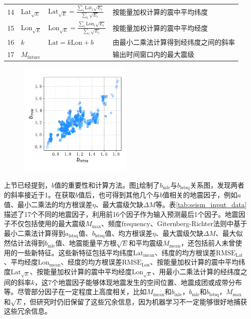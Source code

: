 \begin{table}
\begin{tabular}{llll}
    14 & $\text{Lat}_{\sqrt{E}}$ & $\displaystyle \text{Lat}_{\sqrt{E}}=\frac{\sum_i{\text{Lat}_i\sqrt{E_i}}}{\sum_i{\sqrt{E_i}}}$ & 按能量加权计算的震中平均纬度 \\ 
    15 & $\text{Lon}_{\sqrt{E}}$ & $\displaystyle \text{Lon}_{\sqrt{E}}=\frac{\sum_i{\text{Lon}_i\sqrt{E_i}}}{\sum_i{\sqrt{E_i}}}$ & 按能量加权计算的震中平均经度 \\ 
    16 & $k$ & $\text{Lat}=k\text{Lon}+b$ & 由最小二乘法计算得到经纬度之间的斜率 \\
    17 & $M_{\text{future}}$ & & 输出时间窗口内的最大震级 \\
    \bottomrule
  \end{tabular} 
\end{table}

\begin{figure}[!htbp]
  \centering
  \includegraphics[width=0.50\textwidth]{Img/chap5_seism/seism_b_lstsq_mle_1932_2021.pdf}
  \vspace{-0.5cm}
  \label{fig:seism_b_lstsq_mle_1932_2021}
\end{figure}

上节已经提到，$b$值的重要性和计算方法。图\ref{fig:seism_b_lstsq_mle_1932_2021}绘制了$b_\text{mle}$与$b_\text{lstsq}$关系图，发现两者的斜率接近于1。在获取$b$值后，也可得到其他几个与$b$值相关的地震因子，例如$a$值、最小二乘法的均方根误差$\eta$、最大震级欠缺$\Delta M$等。表\ref{tab:seism_input_data}描述了17个不同的地震因子，利用前16个因子作为输入预测最后1个因子。地震因子不仅包括\citet{Panakkat2007Neural}使用的最大震级$M_{\max}$、频度$\text{frequency}$、Giternberg-Richter法则中基于最小二乘法计算得到$a_{\text{lstsq}}$值、$b_{\text{lstsq}}$值、均方根误差$\eta$、最大震级欠缺$\Delta M$、最大似然估计法得到$b_{\text{mle}}$值、地震能量平方根$\sqrt{E}$和平均震级$M_{\text{mean}}$，还包括前人未曾使用的一些新特征。这些新特征包括平均纬度$\text{Lat}_{\text{mean}}$、纬度的均方根误差$\text{RMSE}_{\text{Lat}}$、平均经度$\text{Lon}_{\text{mean}}$、经度的均方根误差$\text{RMSE}_{\text{Lon}}$、按能量加权计算的震中平均纬度$\text{Lat}_{\sqrt{E}}$、按能量加权计算的震中平均经度$\text{Lon}_{\sqrt{E}}$、用最小二乘法计算的经纬度之间的斜率$k$，这7个地震因子能够体现地震发生的空间位置、地震成团或成带分布等。尽管部分因子在一定程度上高度相关，比如$M_{\text{mean}}$和$b_{\text{mle}}$，$b_{\text{mle}}$和$b_{\text{lstsq}}$，$M_{\max}$和$\sqrt{E}$，但研究时仍旧保留了这些冗余信息，因为机器学习不一定能够很好地捕获这些冗余信息。

